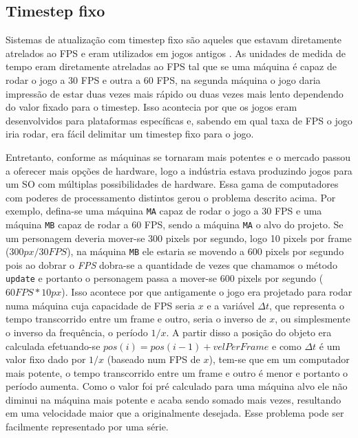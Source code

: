\documentclass[12pt, 
openright, 
oneside, 
a4paper,    
brazil]{facom-ufu-abntex2}
\begin{document}
\subsection{Timestep fixo}
Sistemas de atualização com timestep fixo são aqueles que estavam diretamente atrelados ao FPS e eram utilizados em jogos antigos \cite{GameEngineArchitecture}. As unidades de medida de tempo eram diretamente atreladas ao FPS tal que se uma máquina é capaz de rodar o jogo a 30 FPS e outra a 60 FPS, na segunda máquina o jogo daria impressão de estar duas vezes mais rápido ou duas vezes mais lento dependendo do valor fixado para o timestep. Isso acontecia por que os jogos eram desenvolvidos para plataformas específicas e, sabendo em qual taxa de FPS o jogo iria rodar, era fácil delimitar um timestep fixo para o jogo.

Entretanto, conforme as máquinas se tornaram mais potentes e o mercado passou a oferecer mais opções de hardware, logo a indústria estava produzindo jogos para um SO com múltiplas possibilidades de hardware. Essa gama de computadores com poderes de processamento distintos gerou o problema descrito acima. Por exemplo, defina-se uma máquina \texttt{MA} capaz de rodar o jogo a 30 FPS e uma máquina \texttt{MB} capaz de rodar a 60 FPS, sendo a máquina \texttt{MA} o alvo do projeto. Se um personagem deveria mover-se 300 pixels por segundo, logo 10 pixels por frame ($300 px/ 30 FPS$), na máquina \texttt{MB} ele estaria se movendo a 600 pixels por segundo pois ao dobrar o \textit{FPS} dobra-se a quantidade de vezes que chamamos o método \texttt{update} e portanto o personagem passa a mover-se 600 pixels por segundo ($60 FPS * 10 px$). Isso acontece por que antigamente o jogo era projetado para rodar numa máquina cuja capacidade de FPS seria $x$ e a variável $\Delta t$, que representa o tempo transcorrido entre um frame e outro, seria o inverso de $x$, ou simplesmente o inverso da frequência, o período $1/x$. A partir disso a posição do objeto era calculada efetuando-se $pos(i) = pos(i-1) + velPerFrame$ e como $\Delta t$ é um valor fixo dado por $1/x$ (baseado num FPS de $x$), tem-se que em um computador mais potente, o tempo transcorrido entre um frame e outro é menor e portanto o período aumenta. Como o valor foi pré calculado para uma máquina alvo ele não diminui na máquina mais potente e acaba sendo somado mais vezes, resultando em uma velocidade maior que a originalmente desejada. Esse problema pode ser facilmente representado por uma série.
\end{document}
